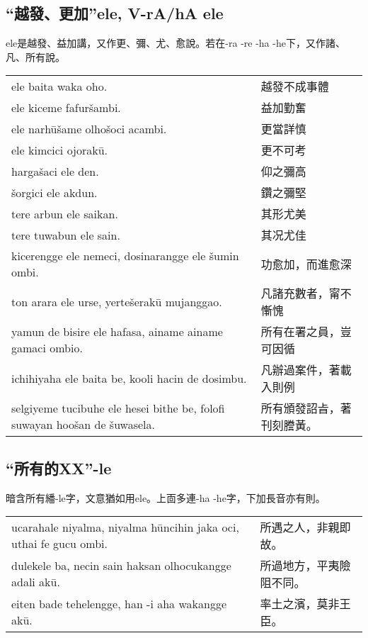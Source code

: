 \documentclass{article}
\begin{document}
\subsection{“越發、更加”ele, V-rA/hA ele}
\noindent ele是越發、益加講，又作更、彌、尤、愈說。若在-ra -re -ha -he下，又作諸、凡、所有說。
\begin{center}
    \begin{tabularx}{\textwidth}{XX}
        ele baita waka oho. & 越發不成事體\\
        ele kiceme fafur\v{s}ambi. & 益加勤奮\\
        ele narh\={u}\v{s}ame olho\v{s}oci acambi. & 更當詳慎\\
        ele kimcici ojorak\={u}. & 更不可考\\
        harga\v{s}aci ele den. & 仰之彌高\\
        \v{s}orgici ele akdun. & 鑽之彌堅\\
        tere arbun ele saikan. & 其形尤美\\
        tere tuwabun ele sain. & 其况尤佳\\
        kicerengge ele nemeci, dosinarangge ele \v{s}umin ombi. & 功愈加，而進愈深\\
        ton arara ele urse, yerte\v{s}erak\={u} mujanggao. & 凡諸充數者，甯不慚愧\\
        yamun de bisire ele hafasa, ainame ainame gamaci ombio. & 所有在署之員，豈可因循\\
        ichihiyaha ele baita be, kooli hacin de dosimbu. & 凡辦過案件，著載入則例\\
        selgiyeme tucibuhe ele hesei bithe be, folofi suwayan hoo\v{s}an de \v{s}uwasela. & 所有頒發詔㫖，著刊刻謄黃。
    \end{tabularx}
\end{center}

\subsection{“所有的XX”-le}
\noindent 暗含所有繙-le字，文意猶如用ele。上靣多連-ha -he字，下加長音亦有則。
\begin{center}
    \begin{tabularx}{\textwidth}{XX}
        ucarahale niyalma, niyalma h\={u}ncihin jaka oci, uthai fe gucu ombi. & 所遇之人，非親即故。\\
        dulekele ba, necin sain haksan olhocukangge adali ak\={u}. & 所過地方，平夷險阻不同。\\
        eiten bade tehelengge, han -i aha wakangge ak\={u}. & 率土之濱，莫非王臣。
    \end{tabularx}
\end{center}
\end{document}
